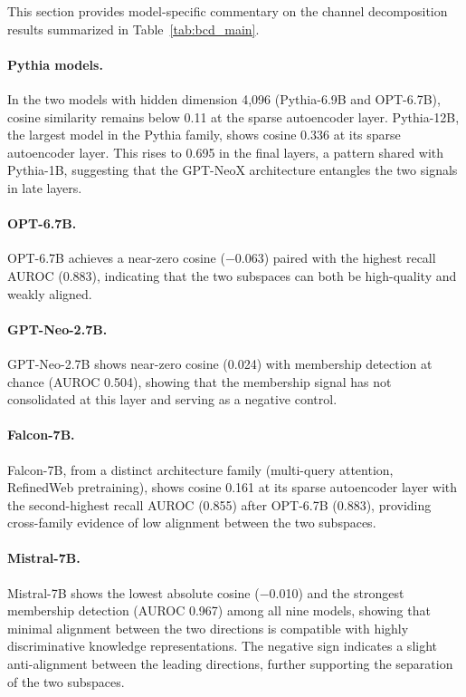 This section provides model-specific commentary on the channel decomposition results summarized in Table~\ref{tab:bcd_main}.

\paragraph{Pythia models.}
In the two models with hidden dimension 4{,}096 (Pythia-6.9B and OPT-6.7B), cosine similarity remains below 0.11 at the sparse autoencoder layer.
Pythia-12B, the largest model in the Pythia family, shows cosine 0.336 at its sparse autoencoder layer.
This rises to 0.695 in the final layers, a pattern shared with Pythia-1B, suggesting that the GPT-NeoX architecture entangles the two signals in late layers.

\paragraph{OPT-6.7B.}
OPT-6.7B achieves a near-zero cosine ($-$0.063) paired with the highest recall AUROC (0.883), indicating that the two subspaces can both be high-quality and weakly aligned.

\paragraph{GPT-Neo-2.7B.}
GPT-Neo-2.7B shows near-zero cosine (0.024) with membership detection at chance (AUROC 0.504), showing that the membership signal has not consolidated at this layer and serving as a negative control.

\paragraph{Falcon-7B.}
Falcon-7B, from a distinct architecture family (multi-query attention, RefinedWeb pretraining), shows cosine 0.161 at its sparse autoencoder layer with the second-highest recall AUROC (0.855) after OPT-6.7B (0.883), providing cross-family evidence of low alignment between the two subspaces.

\paragraph{Mistral-7B.}
Mistral-7B shows the lowest absolute cosine ($-$0.010) and the strongest membership detection (AUROC 0.967) among all nine models, showing that minimal alignment between the two directions is compatible with highly discriminative knowledge representations.
The negative sign indicates a slight anti-alignment between the leading directions, further supporting the separation of the two subspaces.

